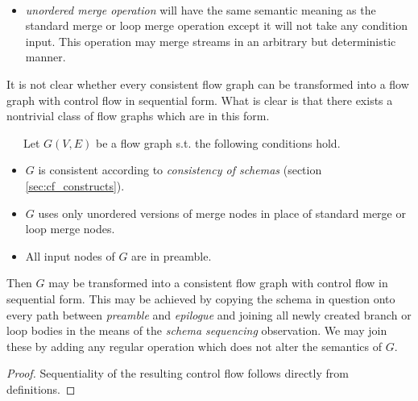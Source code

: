 \begin{define} \ \ \ 
\begin{itemize}
  \item \emph{unordered merge operation} will have the same semantic meaning as the standard merge or loop merge operation except it will not take any condition input. This operation may merge streams in an arbitrary but deterministic manner.
\end{itemize}
\end{define}

It is not clear whether every consistent flow graph can be transformed into a flow graph with control flow in sequential form. What is clear is that there exists a nontrivial class of flow graphs which are in this form.

\begin{observation} \ \ \ 
  Let $G(V,E)$ be a flow graph s.t. the following conditions hold.
  \begin{itemize}
    \item $G$ is consistent according to \emph{consistency of schemas} (section \ref{sec:cf_constructs}).
    \item $G$ uses only unordered versions of merge nodes in place of standard merge or loop merge nodes.
    \item All input nodes of $G$ are in preamble.
  \end {itemize} 
  Then $G$ may be transformed into a consistent flow graph with control flow in sequential form. This may be achieved by copying the schema in question onto every path between \emph{preamble} and \emph{epilogue} and joining all newly created branch or loop bodies in the means of the \emph{schema sequencing} observation. We may join these by adding any regular operation which does not alter the semantics of $G$.
  \begin{proof} 
  Sequentiality of the resulting control flow follows directly from definitions.
  \end{proof}
\end{observation}

